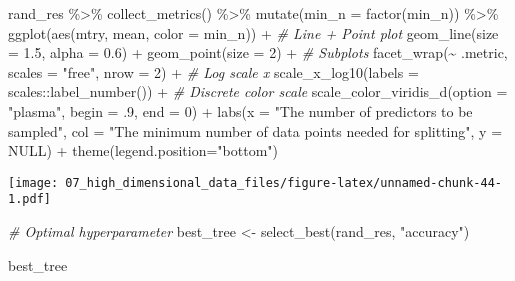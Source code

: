 \documentclass[
]{book}
\newenvironment{Shaded}{\begin{snugshade}}{\end{snugshade}}
\newcommand{\AttributeTok}[1]{\textcolor[rgb]{0.77,0.63,0.00}{#1}}
\newcommand{\CommentTok}[1]{\textcolor[rgb]{0.56,0.35,0.01}{\textit{#1}}}
\newcommand{\ConstantTok}[1]{\textcolor[rgb]{0.00,0.00,0.00}{#1}}
\newcommand{\DecValTok}[1]{\textcolor[rgb]{0.00,0.00,0.81}{#1}}
\newcommand{\FloatTok}[1]{\textcolor[rgb]{0.00,0.00,0.81}{#1}}
\newcommand{\FunctionTok}[1]{\textcolor[rgb]{0.00,0.00,0.00}{#1}}
\newcommand{\NormalTok}[1]{#1}
\newcommand{\OtherTok}[1]{\textcolor[rgb]{0.56,0.35,0.01}{#1}}
\newcommand{\SpecialCharTok}[1]{\textcolor[rgb]{0.00,0.00,0.00}{#1}}
\newcommand{\StringTok}[1]{\textcolor[rgb]{0.31,0.60,0.02}{#1}}
\begin{document}
\begin{Shaded}
\begin{Highlighting}[]
\NormalTok{rand\_res }\SpecialCharTok{\%\textgreater{}\%}
  \FunctionTok{collect\_metrics}\NormalTok{() }\SpecialCharTok{\%\textgreater{}\%}
  \FunctionTok{mutate}\NormalTok{(}\AttributeTok{min\_n =} \FunctionTok{factor}\NormalTok{(min\_n)) }\SpecialCharTok{\%\textgreater{}\%}
  \FunctionTok{ggplot}\NormalTok{(}\FunctionTok{aes}\NormalTok{(mtry, mean, }\AttributeTok{color =}\NormalTok{ min\_n)) }\SpecialCharTok{+}
  \CommentTok{\# Line + Point plot }
  \FunctionTok{geom\_line}\NormalTok{(}\AttributeTok{size =} \FloatTok{1.5}\NormalTok{, }\AttributeTok{alpha =} \FloatTok{0.6}\NormalTok{) }\SpecialCharTok{+}
  \FunctionTok{geom\_point}\NormalTok{(}\AttributeTok{size =} \DecValTok{2}\NormalTok{) }\SpecialCharTok{+}
  \CommentTok{\# Subplots }
  \FunctionTok{facet\_wrap}\NormalTok{(}\SpecialCharTok{\textasciitilde{}}\NormalTok{ .metric, }
             \AttributeTok{scales =} \StringTok{"free"}\NormalTok{, }
             \AttributeTok{nrow =} \DecValTok{2}\NormalTok{) }\SpecialCharTok{+}
  \CommentTok{\# Log scale x }
  \FunctionTok{scale\_x\_log10}\NormalTok{(}\AttributeTok{labels =}\NormalTok{ scales}\SpecialCharTok{::}\FunctionTok{label\_number}\NormalTok{()) }\SpecialCharTok{+}
  \CommentTok{\# Discrete color scale }
  \FunctionTok{scale\_color\_viridis\_d}\NormalTok{(}\AttributeTok{option =} \StringTok{"plasma"}\NormalTok{, }\AttributeTok{begin =}\NormalTok{ .}\DecValTok{9}\NormalTok{, }\AttributeTok{end =} \DecValTok{0}\NormalTok{) }\SpecialCharTok{+}
  \FunctionTok{labs}\NormalTok{(}\AttributeTok{x =} \StringTok{"The number of predictors to be sampled"}\NormalTok{,}
       \AttributeTok{col =} \StringTok{"The minimum number of data points needed for splitting"}\NormalTok{,}
       \AttributeTok{y =} \ConstantTok{NULL}\NormalTok{) }\SpecialCharTok{+}
  \FunctionTok{theme}\NormalTok{(}\AttributeTok{legend.position=}\StringTok{"bottom"}\NormalTok{)}
\end{Highlighting}
\end{Shaded}

\texttt{[image: 07\_high\_dimensional\_data\_files/figure-latex/unnamed-chunk-44-1.pdf]}

\begin{Shaded}
\begin{Highlighting}[]
\CommentTok{\# Optimal hyperparameter}
\NormalTok{best\_tree }\OtherTok{\textless{}{-}} \FunctionTok{select\_best}\NormalTok{(rand\_res, }\StringTok{"accuracy"}\NormalTok{)}

\NormalTok{best\_tree}
\end{Highlighting}
\end{Shaded}
\end{document}

